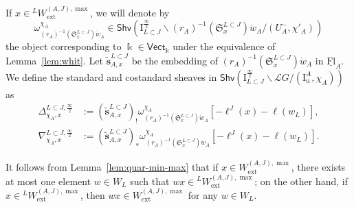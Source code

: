 \documentclass[11pt]{amsart}
\numberwithin{equation}{section}
\theoremstyle{plain}
\theoremstyle{definition}
\newcommand{\I}{{\mathrm I}}
\renewcommand{\k}{\Bbbk}
\newcommand{\sL}{{\mathcal L}}
\newcommand{\Vect}{\mathsf{Vect}}
\newcommand{\semi}{{{\frac{\infty}{2}}}}
\newcommand{\quar}{{{\frac{\infty}{4}}}}
\newcommand{\ex}{\mathrm{ext}}
\newcommand{\Shv}{\mathsf{Shv}}
\newcommand{\Fl}{\mathrm{Fl}}
\newcommand{\bs}{\mathbf{s}}
\newcommand{\Iu}{\mathrm{I}_{\mathrm{u}}}
\newcommand{\rS}{\mathfrak{S}}
\newcommand{\uFl}{\underline{\Fl}}
\begin{document}
If $x \in {}^L W_\ex^{(A,J),\max}$, we will denote by 
\[
\omega_{(r_A)^{-1}(\rS^{L \subset J}_x)\dot{w}_A}^{\chi_A} \in \Shv\left( \I_{L \subset J}^{\semi} \backslash (r_A)^{-1}(\rS^{L \subset J}_x)\dot{w}_A / (U_A^-,\chi'_A) \right)
\]
the object corresponding to $\k\in \Vect_\k$ under the equivalence of Lemma~\ref{lem:whit}.
Let $\widetilde{\bs}^{L \subset J}_{A,x}$ be the embedding of $(r_A)^{-1}(\rS^{L \subset J}_x)\dot{w}_A$ in $\uFl_A$. 
We define the standard and costandard sheaves in $\Shv \left( \I_{L \subset J}^{\semi}\backslash \sL G/(\Iu^A,\chi_A) \right)$ as 
\begin{align*}
\Delta_{\chi_A,x}^{L \subset J, \semi} &:= (\widetilde{\bs}^{L \subset J}_{A,x})_! \omega_{(r_A)^{-1}(\rS^{L \subset J}_x)\dot{w}_A}^{\chi_A} [-\ell^J(x)-\ell(w_L)],
\\
\nabla_{\chi_A,x}^{L \subset J, \semi} &:= (\widetilde{\bs}^{L \subset J}_{A,x})_* \omega_{(r_A)^{-1}(\rS^{L \subset J}_x)\dot{w}_A}^{\chi_A} [-\ell^J(x)-\ell(w_L)].
\end{align*}

It follows from Lemma~\ref{lem:quar-min-max} that if $x\in W_\ex^{(A,J),\max}$, there exists at most one element $w \in W_L$ such that $wx \in {}^L W_\ex^{(A,J),\max}$; on the other hand, if $x\in {}^L W_\ex^{(A,J),\max}$, then $wx \in W_\ex^{(A,J),\max}$ for any $w \in W_L$.
\end{document}
